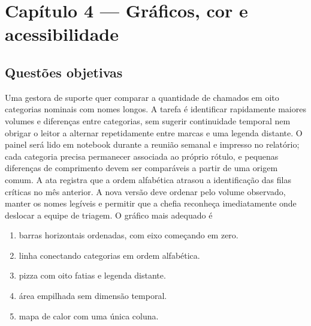 \section{Capítulo 4 --- Gráficos, cor e acessibilidade}
\subsection{Questões objetivas}
\TextoBase Uma gestora de suporte quer comparar a quantidade de chamados em oito categorias nominais com nomes longos. A tarefa é identificar rapidamente maiores volumes e diferenças entre categorias, sem sugerir continuidade temporal nem obrigar o leitor a alternar repetidamente entre marcas e uma legenda distante. O painel será lido em notebook durante a reunião semanal e impresso no relatório; cada categoria precisa permanecer associada ao próprio rótulo, e pequenas diferenças de comprimento devem ser comparáveis a partir de uma origem comum. A ata registra que a ordem alfabética atrasou a identificação das filas críticas no mês anterior. A nova versão deve ordenar pelo volume observado, manter os nomes legíveis e permitir que a chefia reconheça imediatamente onde deslocar a equipe de triagem.
\FonteDidatica
\Comando O gráfico mais adequado é
\begin{enumerate}[label=\Alph*)]\item barras horizontais ordenadas, com eixo começando em zero.\item linha conectando categorias em ordem alfabética.\item pizza com oito fatias e legenda distante.\item área empilhada sem dimensão temporal.\item mapa de calor com uma única coluna.\end{enumerate}

